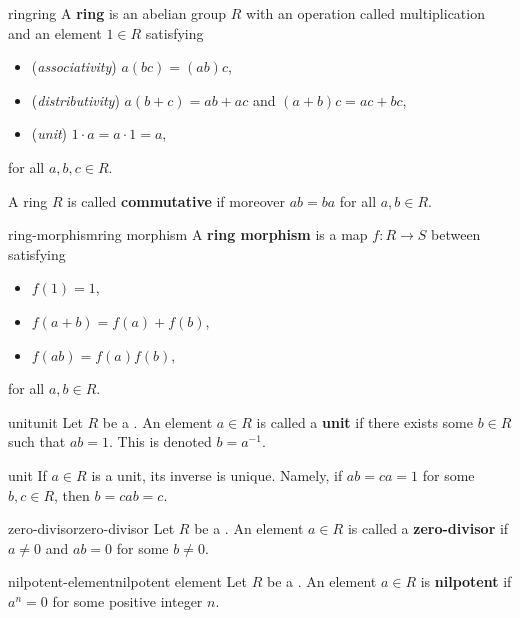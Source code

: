 \begin{topic}{ring}{ring}
    A \textbf{ring} is an abelian group $R$ with an operation called multiplication and an element $1 \in R$ satisfying
    \begin{itemize}
        \item (\textit{associativity}) $a(bc) = (ab)c$,
        \item (\textit{distributivity}) $a(b + c) = ab + ac$ and $(a + b)c = ac + bc$,
        \item (\textit{unit}) $1 \cdot a = a \cdot 1 = a$,
    \end{itemize}
    for all $a, b, c \in R$.
    
    A ring $R$ is called \textbf{commutative} if moreover $ab = ba$ for all $a, b \in R$.
\end{topic}

\begin{topic}{ring-morphism}{ring morphism}
    A \textbf{ring morphism} is a map $f : R \to S$ between  satisfying
    \begin{itemize}
        \item $f(1) = 1$,
        \item $f(a + b) = f(a) + f(b)$,
        \item $f(ab) = f(a) f(b)$,
    \end{itemize}
    for all $a, b \in R$.
\end{topic}

\begin{topic}{unit}{unit}
    Let $R$ be a . An element $a \in R$ is called a \textbf{unit} if there exists some $b \in R$ such that $ab = 1$. This is denoted $b = a^{-1}$.
\end{topic}

\begin{example}{unit}
    If $a \in R$ is a unit, its inverse is unique. Namely, if $ab = ca = 1$ for some $b, c \in R$, then $b = cab = c$.
\end{example}

\begin{topic}{zero-divisor}{zero-divisor}
    Let $R$ be a . An element $a \in R$ is called a \textbf{zero-divisor} if $a \ne 0$ and $ab = 0$ for some $b \ne 0$.
\end{topic}

\begin{topic}{nilpotent-element}{nilpotent element}
    Let $R$ be a . An element $a \in R$ is \textbf{nilpotent} if $a^n = 0$ for some positive integer $n$.
\end{topic}

